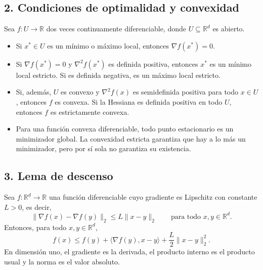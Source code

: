 \documentclass[a4paper,12 pt]{article}
\theoremstyle{definition}
\newcommand{\R}{\mathbb{R}}
\begin{document}
\subsection*{2. Condiciones de optimalidad y convexidad}
Sea $f:U\to\R$ dos veces continuamente diferenciable, donde $U\subseteq\R^d$ es abierto.
\begin{itemize}
    \item Si $x^*\in U$ es un mínimo o máximo local, entonces $\nabla f(x^*)=0$.
    \item Si $\nabla f(x^*)=0$ y $\nabla^2f(x^*)$ es definida positiva, entonces $x^*$ es un mínimo local estricto. Si es definida negativa, es un máximo local estricto.
    \item Si, además, $U$ es convexo y $\nabla^2f(x)$ es semidefinida positiva para todo $x\in U$, entonces $f$ es convexa. Si la Hessiana es definida positiva en todo $U$, entonces $f$ es estrictamente convexa.
    \item Para una función convexa diferenciable, todo punto estacionario es un minimizador global. La convexidad estricta garantiza que hay a lo más un minimizador, pero por sí sola no garantiza su existencia.
\end{itemize}

\subsection*{3. Lema de descenso}
Sea $f:\R^d\to\R$ una función diferenciable cuyo gradiente es Lipschitz con constante $L>0$, es decir,
\[
\|\nabla f(x)-\nabla f(y)\|_2\leq L\|x-y\|_2
\qquad\text{para todo }x,y\in\R^d.
\]
Entonces, para todo $x,y\in\R^d$,
\[
\boxed{f(x)\leq f(y)+\langle\nabla f(y),x-y\rangle
+\frac{L}{2}\|x-y\|_2^2.}
\]
En dimensión uno, el gradiente es la derivada, el producto interno es el producto usual y la norma es el valor absoluto.
\end{document}
